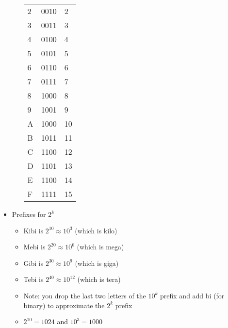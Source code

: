 \documentclass{article}
\begin{document}
\begin{itemize}
\begin{itemize}
\begin{table}
\begin{center}
\begin{tabular}[h]{l l l}
							2 & 0010 & 2 \\
							3 & 0011 & 3 \\
							4 & 0100 & 4 \\
							5 & 0101 & 5 \\
							6 & 0110 & 6 \\
							7 & 0111 & 7 \\
							8 & 1000 & 8 \\
							9 & 1001 & 9 \\
							A & 1000 & 10 \\
							B & 1011 & 11 \\
							C & 1100 & 12 \\
							D & 1101 & 13 \\
							E & 1100 & 14 \\
							F & 1111 & 15 \\
							\hline
						\end{tabular}
					\end{center}
				\end{table}
		\end{itemize}
	\item Prefixes for $2^k$
		\begin{itemize}
			\item Kibi is $2^{10} \approx 10^3$ (which is kilo)
			\item Mebi is $2^{20} \approx 10^6$ (which is mega)
			\item Gibi is $2^{30} \approx 10^9$ (which is giga)
			\item Tebi is $2^{40} \approx 10^{12}$ (which is tera)
			\item Note: you drop the last two letters of the $10^k$ prefix and add bi (for binary) to approximate the $2^k$ prefix
			\item $2^{10} = 1024$ and $10^3 = 1000$
		\end{itemize}
\end{itemize}
\end{document}
